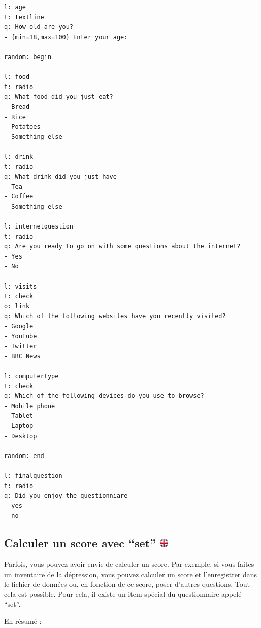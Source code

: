 \documentclass[
]{book}
\begin{document}
\begin{verbatim}
l: age
t: textline
q: How old are you?
- {min=18,max=100} Enter your age:

random: begin

l: food
t: radio
q: What food did you just eat?
- Bread
- Rice
- Potatoes
- Something else

l: drink
t: radio
q: What drink did you just have
- Tea
- Coffee
- Something else

l: internetquestion
t: radio
q: Are you ready to go on with some questions about the internet?
- Yes
- No

l: visits
t: check
o: link
q: Which of the following websites have you recently visited?
- Google
- YouTube
- Twitter
- BBC News

l: computertype
t: check
q: Which of the following devices do you use to browse?
- Mobile phone
- Tablet
- Laptop
- Desktop

random: end

l: finalquestion
t: radio
q: Did you enjoy the questionniare
- yes
- no
\end{verbatim}

\hypertarget{calculer-un-score-avec-set}{%
\subsection[Calculer un score avec ``set'' ]{\texorpdfstring{Calculer un score avec ``set'' \href{https://www.psytoolkit.org/doc3.4.0/online-survey-syntax.html\#scoring}{\protect\includegraphics{img/ukflag.png}}}{Calculer un score avec ``set'' }}\label{calculer-un-score-avec-set}}

Parfois, vous pouvez avoir envie de calculer un score. Par exemple, si vous faites un inventaire de la dépression, vous pouvez calculer un score et l'enregistrer dans le fichier de données ou, en fonction de ce score, poser d'autres questions. Tout cela est possible. Pour cela, il existe un item spécial du questionnaire appelé ``set''.

En résumé :
\end{document}

